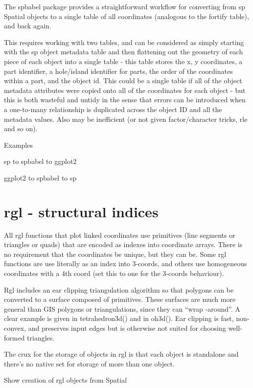 \documentclass[]{book}
\begin{document}
The spbabel package provides a straightforward workflow for converting
from sp Spatial objects to a single table of all coordinates (analogous
to the fortify table), and back again.

This requires working with two tables, and can be considered as simply
starting with the sp object metadata table and then flattening out the
geometry of each piece of each object into a single table - this table
stores the x, y coordinates, a part identifier, a hole/island identifier
for parts, the order of the coordinates within a part, and the object
id. This could be a single table if all of the object metadata
attributes were copied onto all of the coordinates for each object - but
this is both wasteful and untidy in the sense that errors can be
introduced when a one-to-many relationship is duplicated across the
object ID and all the metadata values. Also may be inefficient (or not
given factor/character tricks, rle and so on).

Examples

sp to spbabel to ggplot2

ggplot2 to spbabel to sp

\section{rgl - structural indices}\label{rgl---structural-indices}

All rgl functions that plot linked coordinates use primitives (line
segments or triangles or quads) that are encoded as indexes into
coordinate arrays. There is no requirement that the coordinates be
unique, but they can be. Some rgl functions are use literally as an
index into 3-coords, and others use homogeneous coordinates with a 4th
coord (set this to one for the 3-coords behaviour).

Rgl includes an ear clipping triangulation algorithm so that polygons
can be converted to a surface composed of primitives. These surfaces are
much more general than GIS polygons or triangulations, since they can
``wrap -around''. A clear example is given in tetrahedron3d() and in
oh3d(). Ear clipping is fast, non-convex, and preserves input edges but
is otherwise not suited for choosing well-formed triangles.

The crux for the storage of objects in rgl is that each object is
standalone and there's no native set for storage of more than one
object.

Show creation of rgl objects from Spatial
\end{document}
